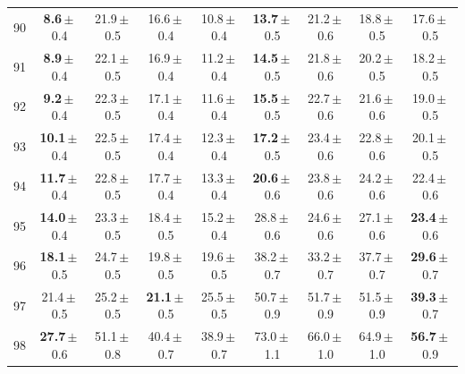 \begin{table}[H]
\begin{tabular}{ccccccccc}
        90 & \textbf{8.6}\,$\pm$\,0.4 & 21.9\,$\pm$\,0.5 & 16.6\,$\pm$\,0.4 & 10.8\,$\pm$\,0.4 & \textbf{13.7}\,$\pm$\,0.5 & 21.2\,$\pm$\,0.6 & 18.8\,$\pm$\,0.5 & 17.6\,$\pm$\,0.5 \\
        91 & \textbf{8.9}\,$\pm$\,0.4 & 22.1\,$\pm$\,0.5 & 16.9\,$\pm$\,0.4 & 11.2\,$\pm$\,0.4 & \textbf{14.5}\,$\pm$\,0.5 & 21.8\,$\pm$\,0.6 & 20.2\,$\pm$\,0.5 & 18.2\,$\pm$\,0.5 \\
        92 & \textbf{9.2}\,$\pm$\,0.4 & 22.3\,$\pm$\,0.5 & 17.1\,$\pm$\,0.4 & 11.6\,$\pm$\,0.4 & \textbf{15.5}\,$\pm$\,0.5 & 22.7\,$\pm$\,0.6 & 21.6\,$\pm$\,0.6 & 19.0\,$\pm$\,0.5 \\
        93 & \textbf{10.1}\,$\pm$\,0.4 & 22.5\,$\pm$\,0.5 & 17.4\,$\pm$\,0.4 & 12.3\,$\pm$\,0.4 & \textbf{17.2}\,$\pm$\,0.5 & 23.4\,$\pm$\,0.6 & 22.8\,$\pm$\,0.6 & 20.1\,$\pm$\,0.5 \\
        94 & \textbf{11.7}\,$\pm$\,0.4 & 22.8\,$\pm$\,0.5 & 17.7\,$\pm$\,0.4 & 13.3\,$\pm$\,0.4 & \textbf{20.6}\,$\pm$\,0.6 & 23.8\,$\pm$\,0.6 & 24.2\,$\pm$\,0.6 & 22.4\,$\pm$\,0.6 \\
        95 & \textbf{14.0}\,$\pm$\,0.4 & 23.3\,$\pm$\,0.5 & 18.4\,$\pm$\,0.5 & 15.2\,$\pm$\,0.4 & 28.8\,$\pm$\,0.6 & 24.6\,$\pm$\,0.6 & 27.1\,$\pm$\,0.6 & \textbf{23.4}\,$\pm$\,0.6 \\
        96 & \textbf{18.1}\,$\pm$\,0.5 & 24.7\,$\pm$\,0.5 & 19.8\,$\pm$\,0.5 & 19.6\,$\pm$\,0.5 & 38.2\,$\pm$\,0.7 & 33.2\,$\pm$\,0.7 & 37.7\,$\pm$\,0.7 & \textbf{29.6}\,$\pm$\,0.7 \\
        97 & 21.4\,$\pm$\,0.5 & 25.2\,$\pm$\,0.5 & \textbf{21.1}\,$\pm$\,0.5 & 25.5\,$\pm$\,0.5 & 50.7\,$\pm$\,0.9 & 51.7\,$\pm$\,0.9 & 51.5\,$\pm$\,0.9 & \textbf{39.3}\,$\pm$\,0.7 \\
        98 & \textbf{27.7}\,$\pm$\,0.6 & 51.1\,$\pm$\,0.8 & 40.4\,$\pm$\,0.7 & 38.9\,$\pm$\,0.7 & 73.0\,$\pm$\,1.1 & 66.0\,$\pm$\,1.0 & 64.9\,$\pm$\,1.0 & \textbf{56.7}\,$\pm$\,0.9 \\

\end{tabular}
\end{table}
